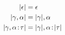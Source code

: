 \begin{align*}
  \lvert \epsilon \rvert                    &= \epsilon \\
  \lvert \gamma, \alpha \rvert            &= \lvert \gamma \rvert, \alpha \\
  \lvert \gamma, \alpha \!:\! \tau \rvert &= \lvert \gamma \rvert, \alpha \!:\! \lvert \tau \rvert
\end{align*}